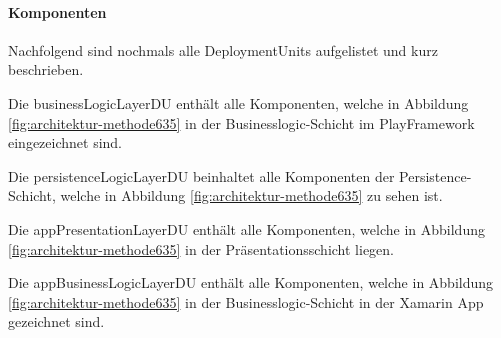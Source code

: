 \paragraph*{Komponenten}
Nachfolgend sind nochmals alle DeploymentUnits aufgelistet und kurz beschrieben.
\begin{description}[leftmargin=!,labelwidth=\widthof{\bfseries appBusinessLogicLayerDU}]
	\item[businessLogicLayerDU] Die businessLogicLayerDU enthält alle Komponenten, welche in Abbildung \ref{fig:architektur-methode635} in der Businesslogic-Schicht im PlayFramework eingezeichnet sind.
	\item[persistenceLogicLayerDU] Die persistenceLogicLayerDU beinhaltet alle Komponenten der Persistence-Schicht, welche in Abbildung \ref{fig:architektur-methode635} zu sehen ist.
	\item[appPresentationLayerDU] Die appPresentationLayerDU enthält alle Komponenten, welche in Abbildung \ref{fig:architektur-methode635} in der Präsentationsschicht liegen.
	\item[appBusinessLogicLayerDU] Die appBusinessLogicLayerDU enthält alle Komponenten, welche in Abbildung \ref{fig:architektur-methode635} in der Businesslogic-Schicht in der Xamarin App gezeichnet sind.
\end{description}